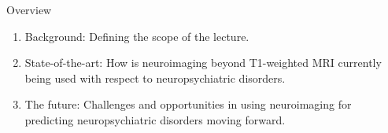 \documentclass[10pt]{beamer}
\subtitle{The role of neuroimaging beyond T1-weighted MRI in the diagnosis and prediction of neuropsychiatric disorders}
\author{Esten H. Leonardsen}
\date{26.10.23}
\begin{document}
	\begin{frame}
	 	\titlepage
	\end{frame}

    \begin{frame}{Overview}
        \begin{enumerate}
            \item Background: Defining the scope of the lecture.
            \item State-of-the-art: How is neuroimaging beyond T1-weighted MRI currently being used with respect to neuropsychiatric disorders.
            \item The future: Challenges and opportunities in using neuroimaging for predicting neuropsychiatric disorders moving forward.
        \end{enumerate}
    \end{frame}
\end{document}
